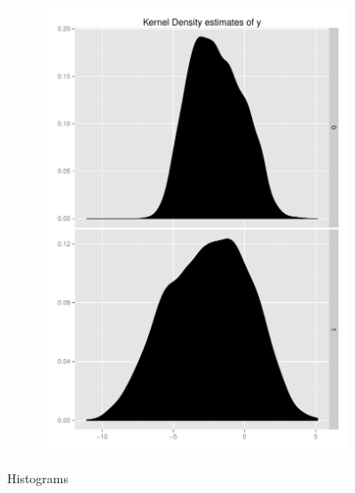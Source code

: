 \documentclass[11pt,letterpaper]{article}
\begin{document}
\begin{figure}[h]
    \begin{subfigure}[b]{0.3\textwidth}\centering \includegraphics[width=1\textwidth]{y} \end{subfigure}    
    \caption{Histograms}		
\end{figure}	
\end{document}
